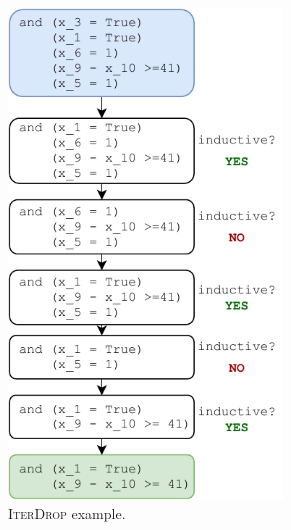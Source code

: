 \begin{figure}[t]
    \centering
   \begin{subfigure}[b]{0.45\textwidth}
   \centering
        \includegraphics[width=0.8\textwidth]{figures/doping-spc_ind_gen.pdf}
        \caption{\textsc{IterDrop} example.}
    	\label{fig:spc_ind_gen}
	\end{subfigure}
    \begin{subfigure}[b]{0.45\textwidth}
    \centering

\end{subfigure}
\end{figure}
